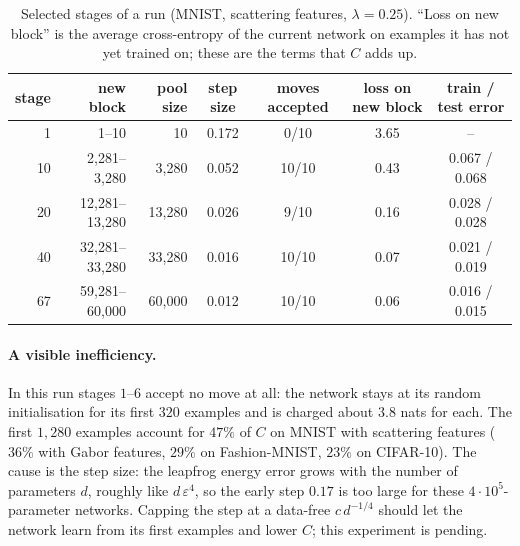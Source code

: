\documentclass[11pt]{article}
\theoremstyle{definition}
\theoremstyle{remark}
\begin{document}
\begin{table}[h]
\centering\small
\begin{tabular}{@{}rrrcccc@{}}
\toprule
stage & new block & pool size & step size & moves accepted & loss on new block & train / test error\\
\midrule
1 & 1--10 & 10 & 0.172 & 0/10 & 3.65 & --\\
10 & 2{,}281--3{,}280 & 3{,}280 & 0.052 & 10/10 & 0.43 & 0.067 / 0.068\\
20 & 12{,}281--13{,}280 & 13{,}280 & 0.026 & 9/10 & 0.16 & 0.028 / 0.028\\
40 & 32{,}281--33{,}280 & 33{,}280 & 0.016 & 10/10 & 0.07 & 0.021 / 0.019\\
67 & 59{,}281--60{,}000 & 60{,}000 & 0.012 & 10/10 & 0.06 & 0.016 / 0.015\\
\bottomrule
\end{tabular}
\caption{Selected stages of a run (MNIST, scattering features, $\lambda=0.25$). ``Loss on new block'' is the average
cross-entropy of the current network on examples it has not yet trained on; these are the terms that $C$ adds up.}\label{tab:stages}
\end{table}

\paragraph{A visible inefficiency.} In this run stages $1$--$6$ accept no move at all: the network stays at its random
initialisation for its first $320$ examples and is charged about $3.8$ nats for each. The first $1{,}280$ examples account
for $47\%$ of $C$ on MNIST with scattering features ($36\%$ with Gabor features, $29\%$ on Fashion-MNIST, $23\%$ on CIFAR-10).
The cause is the step size: the leapfrog energy error grows with the number of parameters $d$, roughly like
$d\,\varepsilon^4$, so the early step $0.17$ is too large for these $4\cdot10^5$-parameter networks. Capping the step at a
data-free $c\,d^{-1/4}$ should let the network learn from its first examples and lower $C$; this experiment is pending.
\end{document}
